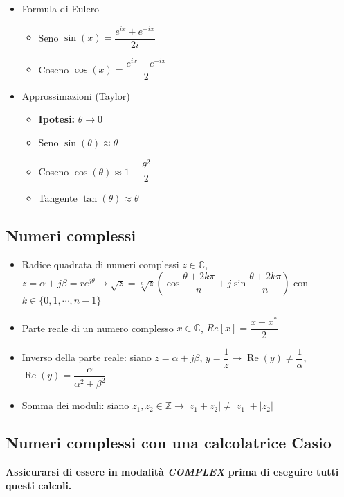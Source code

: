 \documentclass{article}
\begin{document}
\begin{itemize}
\begin{itemize}
	      \end{itemize}
	\item Formula di Eulero
	      \begin{itemize}
		      \item Seno \(\sin(x) = \dfrac{e^{ix} + e^{-ix}}{2i} \)
		      \item Coseno \(\cos(x) = \dfrac{e^{ix} - e^{-ix}}{2} \)
	      \end{itemize}
	\item Approssimazioni (Taylor)
	      \begin{itemize}
		      \item \textbf{Ipotesi:} \( \theta \rightarrow 0 \)
		      \item Seno \( \sin(\theta) \approx \theta \)
		      \item Coseno \( \cos(\theta) \approx 1 - \dfrac{\theta^2}{2} \)
		      \item Tangente \( \tan(\theta) \approx \theta\)
	      \end{itemize}
\end{itemize}

\subsection{Numeri complessi}
\begin{itemize}
	\item Radice quadrata di numeri complessi \(z \in \mathbb{C}\), \\ \( z = \alpha + j \beta = r e^{j \theta} \rightarrow \sqrt{z} = \sqrt[n]{z} \left( \cos{\dfrac{\theta + 2k\pi}{n}} + j \sin{\dfrac{\theta + 2 k \pi}{n}} \right) \) \newline con \(k \in \{0, 1, \cdots, n-1 \} \)
	\item Parte reale di un numero complesso \(x \in \mathbb{C}\), \(Re[x] = \dfrac{x + x^{*}}{2} \)
	\item Inverso della parte reale: siano \(z = \alpha + j \beta \), \(y = \dfrac{1}{z} \rightarrow \operatorname{Re}(y) \neq \dfrac{1}{\alpha}\), \(\operatorname{Re}(y)  = \dfrac{\alpha}{\alpha^2 + \beta^2}\)
	\item Somma dei moduli: siano \(z_1, z_2 \in \mathbb{Z} \rightarrow |z_1 + z_2| \neq |z_1| + |z_2| \)
\end{itemize}

\subsection{Numeri complessi con una calcolatrice Casio}
\textbf{Assicurarsi di essere in modalità \textit{COMPLEX} prima di eseguire tutti questi calcoli.}
\end{document}
